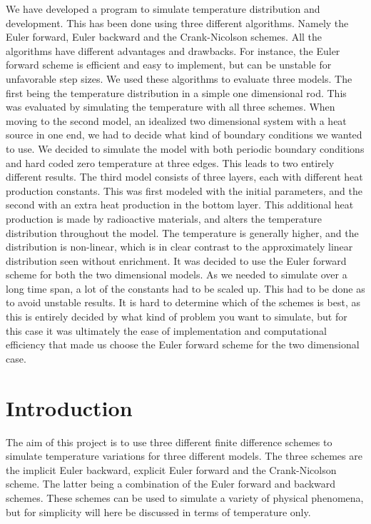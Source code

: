 \documentclass[10pt,a4paper]{article}
\begin{document}
We have developed a program to simulate temperature distribution and development. This has been done using three different algorithms. Namely the Euler forward, Euler backward and the Crank-Nicolson schemes. All the algorithms have different advantages and drawbacks. For instance, the Euler forward scheme is efficient and easy to implement, but can be unstable for unfavorable step sizes. We used these algorithms to evaluate three models. The first being the temperature distribution in a simple one dimensional rod. This was evaluated by simulating the temperature with all three schemes. When moving to the second model, an idealized two dimensional system with a heat source in one end, we had to decide what kind of boundary conditions we wanted to use. We decided to simulate the model with both periodic boundary conditions and hard coded zero temperature at three edges. This leads to two entirely different results. The third model consists of three layers, each with different heat production constants. This was first modeled with the initial parameters, and the second with an extra heat production in the bottom layer. This additional heat production is made by radioactive materials, and alters the temperature distribution throughout the model. The temperature is generally higher, and the distribution is non-linear, which is in clear contrast to the approximately linear distribution seen without enrichment. It was decided to use the Euler forward scheme for both the two dimensional models. As we needed to simulate over a long time span, a lot of the constants had to be scaled up. This had to be done as to avoid unstable results. It is hard to determine which of the schemes is best, as this is entirely decided by what kind of problem you want to simulate, but for this case it was ultimately the ease of implementation and computational efficiency that made us choose the Euler forward scheme for the two dimensional case. 

\newpage
\section*{Introduction}
The aim of this project is to use three different finite difference schemes to simulate temperature variations for three different models. The three schemes are the implicit Euler backward, explicit Euler forward and the Crank-Nicolson scheme. The latter being a combination of the Euler forward and backward schemes. These schemes can be used to simulate a variety of physical phenomena, but for simplicity will here be discussed in terms of temperature only.\\ 
\end{document}
